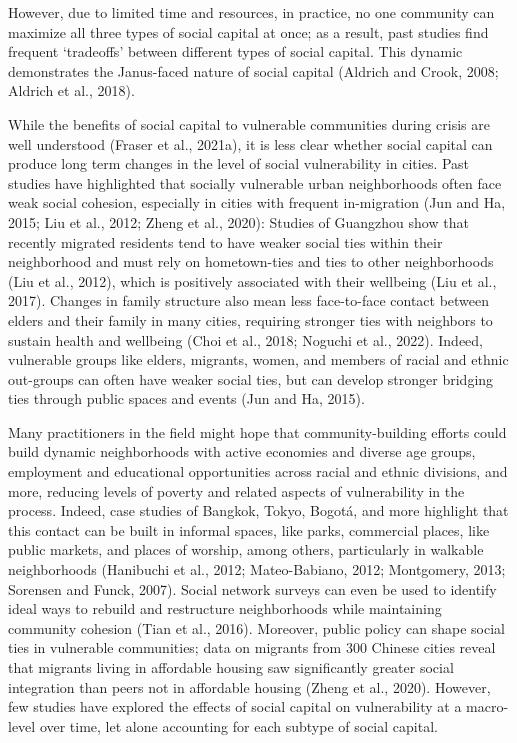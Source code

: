 \documentclass[]{elsarticle} %
\begin{document}
However, due to limited time and resources, in practice, no one
community can maximize all three types of social capital at once; as a
result, past studies find frequent `tradeoffs' between different types
of social capital. This dynamic demonstrates the Janus-faced nature of
social capital (Aldrich and Crook, 2008; Aldrich et al., 2018).

While the benefits of social capital to vulnerable communities during
crisis are well understood (Fraser et al., 2021a), it is less clear
whether social capital can produce long term changes in the level of
social vulnerability in cities. Past studies have highlighted that
socially vulnerable urban neighborhoods often face weak social cohesion,
especially in cities with frequent in-migration (Jun and Ha, 2015; Liu
et al., 2012; Zheng et al., 2020): Studies of Guangzhou show that
recently migrated residents tend to have weaker social ties within their
neighborhood and must rely on hometown-ties and ties to other
neighborhoods (Liu et al., 2012), which is positively associated with
their wellbeing (Liu et al., 2017). Changes in family structure also
mean less face-to-face contact between elders and their family in many
cities, requiring stronger ties with neighbors to sustain health and
wellbeing (Choi et al., 2018; Noguchi et al., 2022). Indeed, vulnerable
groups like elders, migrants, women, and members of racial and ethnic
out-groups can often have weaker social ties, but can develop stronger
bridging ties through public spaces and events (Jun and Ha, 2015).

Many practitioners in the field might hope that community-building
efforts could build dynamic neighborhoods with active economies and
diverse age groups, employment and educational opportunities across
racial and ethnic divisions, and more, reducing levels of poverty and
related aspects of vulnerability in the process. Indeed, case studies of
Bangkok, Tokyo, Bogotá, and more highlight that this contact can be
built in informal spaces, like parks, commercial places, like public
markets, and places of worship, among others, particularly in walkable
neighborhoods (Hanibuchi et al., 2012; Mateo-Babiano, 2012; Montgomery,
2013; Sorensen and Funck, 2007). Social network surveys can even be used
to identify ideal ways to rebuild and restructure neighborhoods while
maintaining community cohesion (Tian et al., 2016). Moreover, public
policy can shape social ties in vulnerable communities; data on migrants
from 300 Chinese cities reveal that migrants living in affordable
housing saw significantly greater social integration than peers not in
affordable housing (Zheng et al., 2020). However, few studies have
explored the effects of social capital on vulnerability at a macro-level
over time, let alone accounting for each subtype of social capital.
\end{document}
